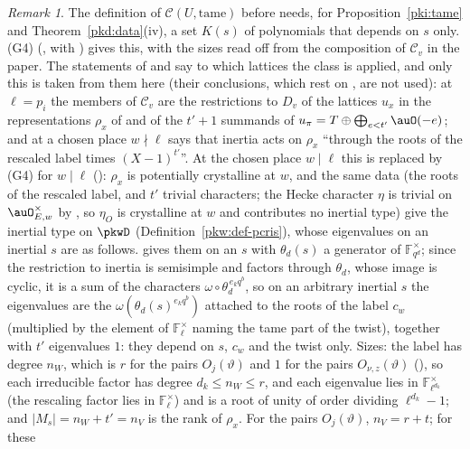 \documentclass[10pt]{amsart}
\theoremstyle{definition}
\theoremstyle{remark}
\newtheorem{remark}[theorem]{Remark}
\begin{document}
\begin{remark}
The definition of $\mathcal C(U,\mathrm{tame})$ before
{\cite[Proposition~5.2]{P55}} needs, for Proposition~\ref{pki:tame} and Theorem~\ref{pkd:data}(iv), a set $K(s)$ of
polynomials that depends on $s$ only. (G4) ({\cite[Proposition~6.6]{P55}}, with {\cite[Lemma~6.4]{P55}}) gives this, with the sizes read off from the
composition of $\mathcal C_v$ in the paper. The statements of {\cite[Proposition~2.28]{P55}} and {\cite[Proposition~4.5(b)]{P55}} say to which lattices the class is applied, and only this is taken from them here (their conclusions, which rest on {\cite[Theorem~5.8]{P55}}, are not used): at
$\ell=p_i$ the members of $\mathcal C_v$ are the restrictions to $D_v$ of the lattices $u_x$ in the representations
$\rho_x$ of {\cite[Proposition~4.6(c)]{P55}} and of the $t'+1$ summands of $u_\pi=T\oplus\bigoplus_{e<t'}\auO(-e)$; and
at a chosen place $w\nmid\ell$ {\cite[Proposition~4.6(c)]{P55}} says that inertia acts on $\rho_x$ ``through the roots of the
rescaled label times $(X-1)^{t'}$''. At the chosen place $w\mid\ell$ this is replaced by (G4) for $w\mid\ell$
({\cite[Proposition~6.6]{P55}}): $\rho_x$ is potentially crystalline at $w$, and the same data (the roots of the rescaled
label, and $t'$ trivial characters; the Hecke character $\eta$ is trivial on $\auO_{E,w}^\times$ by {\cite[Lemma~8.27]{P55}}, so $\eta_O$ is
crystalline at $w$ and contributes no inertial type) give the inertial type on $\pkwD$ (Definition~\ref{pkw:def-pcris}), whose eigenvalues on an
inertial $s$ are as follows. {\cite[Lemma~6.4]{P55}} gives them on an $s$ with $\theta_d(s)$ a generator of
$\mathbb F_{q^d}^\times$; since the restriction to inertia is semisimple and factors through $\theta_d$, whose
image is cyclic, it is a sum of the characters $\omega\circ\theta_d^{\,e_kq^b}$, so on an arbitrary inertial $s$
the eigenvalues are the $\omega(\theta_d(s)^{e_kq^b})$ attached to the roots of the label $c_w$ (multiplied by the
element of $\mathbb F_\ell^\times$ naming the tame part of the twist), together with $t'$ eigenvalues $1$:
they depend on $s$, $c_w$ and the twist only. Sizes: the label has degree $n_W$, which is $r$ for the pairs
$O_j(\vartheta)$ and $1$ for the pairs $O_{\nu,z}(\vartheta)$ ({\cite[\S2.1]{P55}}), so each irreducible
factor has degree $d_k\le n_W\le r$, and each eigenvalue lies in $\mathbb F_{\ell^{d_k}}^\times$ (the rescaling
factor lies in $\mathbb F_\ell^\times$) and is a root of unity of order dividing $\ell^{d_k}-1$; and
$|M_s|=n_W+t'=n_V$ is the rank of $\rho_x$. For the pairs $O_j(\vartheta)$, $n_V=r+t$; for these

\end{remark}
\end{document}
